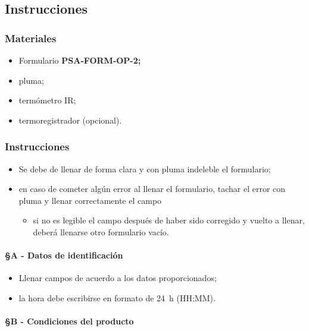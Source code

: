 \subsection{Instrucciones}

\subsubsection{Materiales}

\begin{itemize}
	\item Formulario \textbf{PSA-FORM-OP-2;}
	\item pluma;
	\item termómetro IR;
	\item termoregistrador (opcional).
\end{itemize}

\subsubsection{Instrucciones}

\begin{itemize}
	\item Se debe de llenar de forma clara y con pluma indeleble el formulario;
	\item en caso de cometer algún error al llenar el formulario, tachar el error con pluma y llenar correctamente el campo
	\begin{itemize}
		\item si no es legible el campo después de haber sido corregido y vuelto a llenar, deberá llenarse otro formulario vacío.
	\end{itemize}
\end{itemize}

\paragraph{§A - Datos de identificación}

\begin{itemize}
	\item Llenar campos de acuerdo a los datos proporcionados;
	\item la hora debe escribirse en formato de \SI{24}{\hour} (HH:MM).
\end{itemize}

\paragraph{§B - Condiciones del producto}

